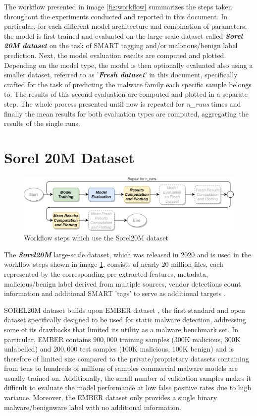 \documentclass[pdfa%
,cucitura%
]{toptesi}
\begin{document}
The workflow presented in image \ref{fig:workflow} summarizes the steps taken throughout the experiments conducted and reported in this document. In particular, for each different model architecture and combination of parameters, the model is first trained and evaluated on the large-scale dataset called \textit{\textbf{Sorel 20M dataset}} \cite{HarangSOREL20M} on the task of SMART tagging and/or malicious/benign label prediction. Next, the model evaluation results are computed and plotted. Depending on the model type, the model is then optionally evaluated also using a smaller dataset, referred to as '\textit{\textbf{Fresh dataset}}' in this document, specifically crafted for the task of predicting the malware family each specific sample belongs to. The results of this second evaluation are computed and plotted in a separate step. The whole process presented until now is repeated for \textit{n\_runs} times and finally the mean results for both evaluation types are computed, aggregating the results of the single runs.

\section{Sorel 20M Dataset}
\begin{figure}[h!]
	\centering
	\includegraphics[width=\textwidth]{./images/workflow_sorel.png}
	\caption[Sorel20M workflow steps]{Workflow steps which use the Sorel20M dataset}
	\label{fig:workflow_sorel}
\end{figure}

The \textit{\textbf{Sorel20M}} large-scale dataset, which was released in 2020 and is used in the workflow steps shown in image \ref{fig:workflow_sorel}, consists of nearly 20 million files, each represented by the corresponding pre-extracted features, metadata, malicious/benign label derived from multiple sources, vendor detections count information and additional SMART 'tags' to serve as additional targets \cite{HarangSOREL20M}.

SOREL20M dataset builds upon EMBER dataset \cite{AndersonEMBER}, the first standard and open dataset specifically designed to be used for static malware detection, addressing some of its drawbacks that limited its utility as a malware benchmark set. In particular, EMBER contains $900,000$ training samples (300K malicious, 300K unlabelled) and $200,000$ test samples (100K malicious, 100K benign) and is therefore of limited size compared to the private/proprietary datasets containing from tens to hundreds of millions of samples commercial malware models are usually trained on. Additionally, the small number of validation samples makes it difficult to evaluate the model performance at low false positive rates due to high variance. Moreover, the EMBER dataset only provides a single binary malware/benignware label with no additional information.
\end{document}
